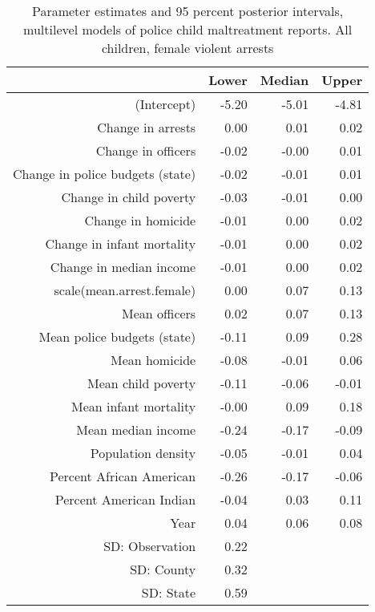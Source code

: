 \begin{table}[ht]
\centering
\begin{tabular}{rrrr}
  \hline
 & Lower & Median & Upper \\ 
  \hline
(Intercept) & -5.20 & -5.01 & -4.81 \\ 
  Change in arrests & 0.00 & 0.01 & 0.02 \\ 
  Change in officers & -0.02 & -0.00 & 0.01 \\ 
  Change in police budgets (state) & -0.02 & -0.01 & 0.01 \\ 
  Change in child poverty & -0.03 & -0.01 & 0.00 \\ 
  Change in homicide & -0.01 & 0.00 & 0.02 \\ 
  Change in infant mortality & -0.01 & 0.00 & 0.02 \\ 
  Change in median income & -0.01 & 0.00 & 0.02 \\ 
  scale(mean.arrest.female) & 0.00 & 0.07 & 0.13 \\ 
  Mean officers & 0.02 & 0.07 & 0.13 \\ 
  Mean police budgets (state) & -0.11 & 0.09 & 0.28 \\ 
  Mean homicide & -0.08 & -0.01 & 0.06 \\ 
  Mean child poverty & -0.11 & -0.06 & -0.01 \\ 
  Mean infant mortality & -0.00 & 0.09 & 0.18 \\ 
  Mean median income & -0.24 & -0.17 & -0.09 \\ 
  Population density & -0.05 & -0.01 & 0.04 \\ 
  Percent African American & -0.26 & -0.17 & -0.06 \\ 
  Percent American Indian & -0.04 & 0.03 & 0.11 \\ 
  Year & 0.04 & 0.06 & 0.08 \\ 
  SD: Observation & 0.22 &  &  \\ 
  SD: County & 0.32 &  &  \\ 
  SD: State & 0.59 &  &  \\ 
   \hline
\end{tabular}
\caption{Parameter estimates and 95 percent posterior intervals, multilevel models of 
             police child maltreatment reports. All children, female violent arrests} 
\end{table}
